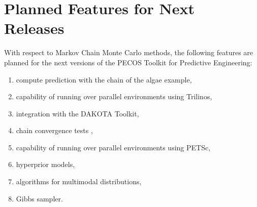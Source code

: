 \section{Planned Features for Next Releases}\label{sc-gmc-planned-features}
With respect to Markov Chain Monte Carlo methods, the following features are planned for the next versions of the PECOS Toolkit for Predictive Engineering:
\begin{enumerate}
\item compute prediction with the chain of the algae example,
\item capability of running over parallel environments using Trilinos,
\item integration with the DAKOTA Toolkit,
\item chain convergence tests \cite{BrRo98},
\item capability of running over parallel environments using PETSc,
\item hyperprior models,
\item algorithms for multimodal distributions,
\item Gibbs sampler.
\end{enumerate}
 
